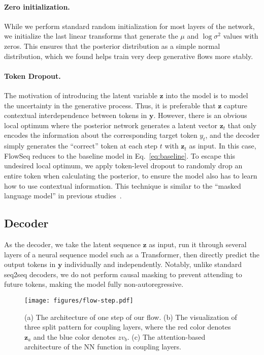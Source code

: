 \documentclass[11pt,a4paper]{article}
\newcommand{\yv}{\mathbf{y}}
\newcommand{\zv}{\mathbf{z}}
\begin{document}
\paragraph{Zero initialization.} While we perform standard random initialization for most layers of the network, we initialize the last linear transforms that generate the $\mu$ and $\log \sigma^2$ values with zeros.
This ensures that the posterior distribution as a simple normal distribution, which we found helps train very deep generative flows more stably.

\paragraph{Token Dropout.} 
The motivation of introducing the latent variable $\zv$ into the model is to model the uncertainty in the generative process.
Thus, it is preferable that $\zv$ capture contextual interdependence between tokens in $\yv$.
However, there is an obvious local optimum where the posterior network generates a latent vector $\zv_t$ that only encodes the information about the corresponding target token $y_t$, and the decoder simply generates the ``correct'' token at each step $t$ with $\zv_t$ as input.
In this case, FlowSeq reduces to the baseline model in Eq.~\eqref{eq:baseline}.
To escape this undesired local optimum, we apply token-level dropout to randomly drop an entire token when calculating the posterior, to ensure the model also has to learn how to use contextual information.
This technique is similar to the ``masked language model'' in previous studies~\citep{melamud-etal-2016-context2vec,devlin2018bert,P18-1130}.

\vspace{-2mm}
\subsection{Decoder}
As the decoder, we take the latent sequence $\zv$ as input, run it through several layers of a neural sequence model such as a Transformer, then directly predict the output tokens in $\yv$ individually and independently.
Notably, unlike standard seq2seq decoders,
we do not perform causal masking to prevent attending to future tokens,
making the model fully non-autoregressive.



\begin{figure*}[tb]
  \centering
  \texttt{[image: figures/flow-step.pdf]}
  \vspace{-2mm}
  \caption{(a) The architecture of one step of our flow.
  (b) The visualization of three split pattern for coupling layers, where the red color denotes $\zv_a$ and the blue color denotes $zv_b$.
  (c) The attention-based architecture of the NN function in coupling layers.} 
  \label{fig:flowstep}
  \vspace{-5mm}
\end{figure*}
\end{document}

